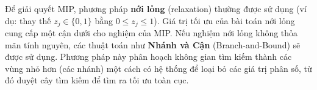 Để giải quyết MIP, phương pháp \textbf{nới lỏng} (relaxation) thường được sử dụng (ví dụ: thay thế $z_j \in \{0,1\}$ bằng $0 \leq z_j \leq 1$). Giá trị tối ưu của bài toán nới lỏng cung cấp một cận dưới cho nghiệm của MIP. Nếu nghiệm nới lỏng không thỏa mãn tính nguyên, các thuật toán như \textbf{Nhánh và Cận} (Branch-and-Bound) sẽ được sử dụng. Phương pháp này phân hoạch không gian tìm kiếm thành các vùng nhỏ hơn (các nhánh) một cách có hệ thống để loại bỏ các giá trị phân số, từ đó duyệt cây tìm kiếm để tìm ra tối ưu toàn cục.